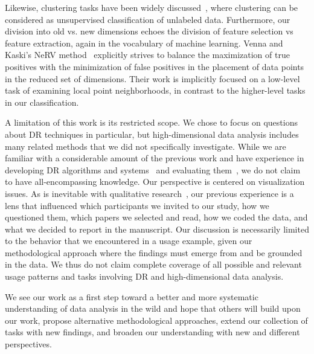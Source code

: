 Likewise, clustering tasks have been widely discussed~\cite{Jain2010,Xu2005}, where clustering can be considered as unsupervised classification of unlabeled data. 
Furthermore, our division into old vs. new dimensions echoes the division of feature selection vs feature extraction, again in the vocabulary of machine learning. 
Venna and Kaski's NeRV method~\cite{Venna2007} explicitly strives to balance the maximization of true positives with the minimization of false positives in the placement of data points in the reduced set of dimensions.
Their work is implicitly focused on a low-level task of examining local point neighborhoods, in contrast to the higher-level tasks in our classification.

A limitation of this work is its restricted scope. We chose to focus on questions about \ac{DR} techniques in particular, but high-dimensional data analysis includes many related methods that we did not specifically investigate.
While we are familiar with a considerable amount of the previous work and have experience in developing \ac{DR} algorithms and systems~\cite{Ingram2012a,Ingram2010,Ingram2009,Ingram2012,Williams2004}
and evaluating them~\cite{Sedlmair2012a,Tory2007}, we do not claim to have all-encompassing knowledge.
Our perspective is centered on visualization issues. 
As is inevitable with qualitative research~\cite{Charmaz2006}, our previous experience is a lens that influenced which participants we invited to our study, how we questioned them, which papers we selected and read, how we coded the data, and what we decided to report in the manuscript.  
Our discussion is necessarily limited to the behavior that we encountered in a usage example, given our methodological approach where the findings must emerge from and be grounded in the data. 
We thus do not claim complete coverage of all possible and relevant usage patterns and tasks involving \ac{DR} and high-dimensional data analysis. 

We see our work as a first step toward a better and more systematic understanding of data analysis in the wild and hope that others will build upon our work, propose alternative methodological approaches, extend our collection of tasks with new findings, and broaden our understanding with new and different perspectives.

